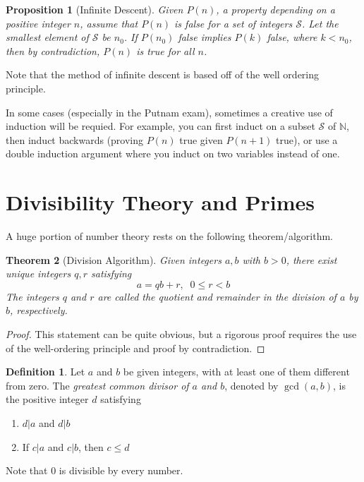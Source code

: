 \documentclass{article}
\newtheorem{theorem}{Theorem}[section]
\newtheorem{proposition}[theorem]{Proposition}
\theoremstyle{remark}
\theoremstyle{definition}
\newtheorem{definition}{Definition}[section]
\begin{document}
\begin{proposition}[Infinite Descent]
Given $P(n)$, a property depending on a positive integer $n$, assume that $P(n)$ is false for a set of integers $\mathcal{S}$. Let the smallest element of $\mathcal{S}$ be $n_0$. If $P(n_0)$ false implies $P(k)$ false, where $k < n_0$, then by contradiction, $P(n)$ is true for all $n$. 
\end{proposition}
Note that the method of infinite descent is based off of the well ordering principle. 

In some cases (especially in the Putnam exam), sometimes a creative use of induction will be requied. For example, you can first induct on a subset $\mathcal{S}$ of $\mathbb{N}$, then induct backwards (proving $P(n)$ true given $P(n+1)$ true), or use a double induction argument where you induct on two variables instead of one.

\section{Divisibility Theory and Primes}
A huge portion of number theory rests on the following theorem/algorithm. 

\begin{theorem}[Division Algorithm]
Given integers $a, b$ with $b > 0$, there exist unique integers $q, r$ satisfying
\[a = q b + r, \;\; 0 \leq r < b\]
The integers $q$ and $r$ are called the \textit{quotient} and \textit{remainder} in the division of $a$ by $b$, respectively. 
\end{theorem}
\begin{proof}
This statement can be quite obvious, but a rigorous proof requires the use of the well-ordering principle and proof by contradiction. 
\end{proof}

\begin{definition}
Let $a$ and $b$ be given integers, with at least one of them different from zero. The \textit{greatest common divisor of $a$ and $b$}, denoted by $\gcd(a, b)$, is the positive integer $d$ satisfying
\begin{enumerate}
    \item $d |a$ and $d|b$
    \item If $c|a$ and $c|b$, then $c \leq d$ 
\end{enumerate}
Note that $0$ is divisible by every number. 
\end{definition}
\end{document}
